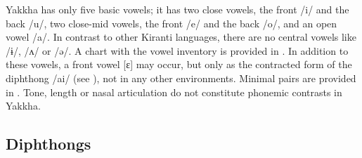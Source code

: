 Yakkha has only five basic vowels; it has two close vowels, the front /i/ and the back /u/, two close-mid vowels, the front /e/ and the back /o/, and an open vowel /a/. In contrast to other Kiranti languages,  there are no central vowels like  /ɨ/, /ʌ/ or /ə/. A chart with the vowel inventory is provided in . In addition to these vowels, a  front vowel [ɛ] may occur, but only as the  contracted form of the diphthong /ai/ (see ), not in any other environments. Minimal pairs are provided in . Tone, length or nasal articulation do not constitute phonemic contrasts in Yakkha. 




 \begin{table} 	
\caption{Minimal pairs for vowel phonemes}\label{min-pair-v}

\end{table}


\subsection{Diphthongs}\label{diphth}

